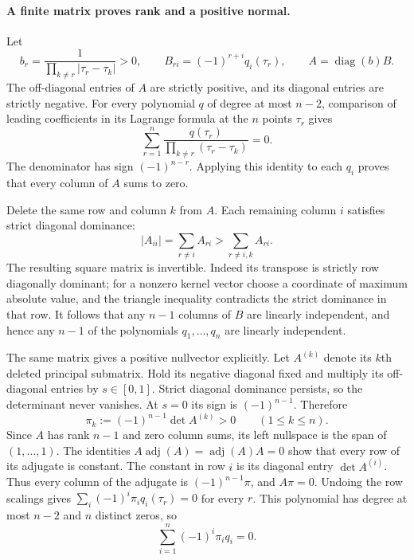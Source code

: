 \documentclass[11pt]{article}
\newcommand{\diag}{\operatorname{diag}}
\theoremstyle{remark}\newtheorem{remark}[theorem]{Remark}
\begin{document}
\paragraph{A finite matrix proves rank and a positive normal.}
\label{polyretry:peak-laplacian}
Let
\[
 b_r=\frac1{\prod_{k\ne r}|\tau_r-\tau_k|}>0,\qquad
 B_{ri}=(-1)^{r+i}q_i(\tau_r),\qquad A=\diag(b)B.
\]
The off-diagonal entries of $A$ are strictly positive, and its
diagonal entries are strictly negative.  For every polynomial
$q$ of degree at most $n-2$, comparison of leading coefficients
in its Lagrange formula at the $n$ points $\tau_r$ gives
\[
 \sum_{r=1}^n
 \frac{q(\tau_r)}{\prod_{k\ne r}(\tau_r-\tau_k)}=0.
\]
The denominator has sign $(-1)^{n-r}$.  Applying this identity
to each $q_i$ proves that every column of $A$ sums to zero.

Delete the same row and column $k$ from $A$.  Each remaining
column $i$ satisfies strict diagonal dominance:
\[
 |A_{ii}|=\sum_{r\ne i}A_{ri}
          >\sum_{r\ne i,k}A_{ri}.
\]
The resulting square matrix is invertible.  Indeed its
transpose is strictly row diagonally dominant; for a nonzero
kernel vector choose a coordinate of maximum absolute value,
and the triangle inequality contradicts the strict dominance
in that row.  It follows that any $n-1$ columns of $B$ are
linearly independent, and hence any $n-1$ of the polynomials
$q_1,\ldots,q_n$ are linearly independent.

The same matrix gives a positive nullvector explicitly.
Let $A^{(k)}$ denote its $k$th deleted principal submatrix.
Hold its negative diagonal fixed and multiply its off-diagonal
entries by $s\in[0,1]$.  Strict diagonal dominance persists,
so the determinant never vanishes.  At $s=0$ its sign is
$(-1)^{n-1}$.  Therefore
\begin{equation}\label{polyretry:laplacian-cofactor}
 \pi_k:=(-1)^{n-1}\det A^{(k)}>0\qquad(1\le k\le n).
\end{equation}
Since $A$ has rank $n-1$ and zero column sums, its left
nullspace is the span of $(1,\ldots,1)$.  The identities
$A\operatorname{adj}(A)=\operatorname{adj}(A)A=0$ show that
every row of its adjugate is constant.  The constant in row
$i$ is its diagonal entry $\det A^{(i)}$.  Thus every column
of the adjugate is $(-1)^{n-1}\pi$, and $A\pi=0$.
Undoing the row scalings gives
$\sum_i(-1)^i\pi_iq_i(\tau_r)=0$ for every $r$.
This polynomial has degree at most $n-2$ and $n$ distinct
zeros, so
\begin{equation}\label{polyretry:positive-q-relation}
 \sum_{i=1}^n(-1)^i\pi_iq_i=0.
\end{equation}
\end{document}
